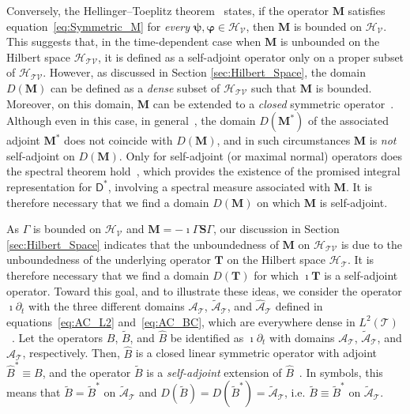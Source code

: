\documentclass[leqno,onefignum,onetabnum]{siamltex1213}
\newcommand{\Mb}{\mathbf{M}}
\newcommand{\Tb}{\mathbf{T}}
\newcommand{\Sb}{\mathbf{S}}
\newcommand{\Tc}{\mathcal{T}}
\newcommand{\Vc}{\mathcal{V}}
\newcommand{\Hc}{\mathcal{H}}
\newcommand{\Dm}{\mathsf{D}}
\newcommand{\As}{\mathscr{A}}
\newcommand{\vecpsi}{\boldsymbol{\psi}}
\newcommand{\vecvarphi}{\boldsymbol{\varphi}}
\begin{document}
Conversely, the Hellinger--Toeplitz theorem~\cite{Reed-1980} states,
if the operator $\Mb$ satisfies equation~\eqref{eq:Symmetric_M} for
\emph{every} $\vecpsi,\vecvarphi\in\Hc_{\Vc}$, then $\Mb$ is
bounded on $\Hc_{\Vc}$. This suggests that, in the time-dependent
case when $\Mb$ is unbounded on the Hilbert space $\Hc_{\Tc\Vc}$, it
is defined as a self-adjoint operator only on a proper subset of
$\Hc_{\Tc\Vc}$. However, as discussed in 
Section \ref{sec:Hilbert_Space}, the domain $D(\Mb)$ can be defined as
a \emph{dense} subset of $\Hc_{\Tc\Vc}$ such that $\Mb$ is
bounded. Moreover, on this domain, $\Mb$ can be extended to a 
\emph{closed} symmetric operator~\cite{Reed-1980,Stone:64}. Although
even in this case, in general~\cite{Reed-1980}, the domain $D(\Mb^*)$
of the associated adjoint $\Mb^*$ does not coincide with $D(\Mb)$, and
in such circumstances $\Mb$ is \emph{not} self-adjoint on $D(\Mb)$. Only for
self-adjoint (or maximal normal) operators does the spectral theorem
hold~\cite{Reed-1980}, which provides the existence of the promised 
integral representation for $\Dm^*$, involving a spectral measure
associated with $\Mb$. It is therefore necessary that we find a
domain $D(\Mb)$ on which $\Mb$ is self-adjoint.




As $\Gamma$ is bounded on $\Hc_{\Vc}$ and
$\Mb=-\imath\Gamma\Sb\Gamma$, our discussion in Section
\ref{sec:Hilbert_Space} indicates that the unboundedness of $\Mb$ on
$\Hc_{\Tc\Vc}$ is due to the unboundedness of the underlying operator
$\Tb$ on the Hilbert space $\Hc_{\Tc}$. It is therefore necessary
that we find a domain $D(\Tb)$ for which $\imath\Tb$ is a self-adjoint
operator. Toward this goal, and to illustrate these ideas, we consider
the operator $\imath\partial_t$ with the three different domains $\As_{\Tc}$,
$\tilde{\As}_{\Tc}$, and $\hat{\As}_{\Tc}$ defined in
equations~\eqref{eq:AC_L2} and~\eqref{eq:AC_BC}, which are everywhere
dense in $L^2(\Tc)$~\cite{Stone:64}. Let the operators $B$, $\tilde{B}$, and
$\hat{B}$ be identified as $\imath\partial_t$ with domains $\As_{\Tc}$,
$\tilde{\As}_{\Tc}$, and $\hat{\As}_{\Tc}$, respectively. Then,
$\hat{B}$ is a closed linear symmetric operator with adjoint
$\hat{B}^*\equiv B$, and the operator $\tilde{B}$ is a \emph{self-adjoint}
extension of $\hat{B}$~\cite{Stone:64}. In symbols, this means that 
$\tilde{B}=\tilde{B}^*$ on $\tilde{\As}_{\Tc}$ and
$D(\tilde{B})=D(\tilde{B}^*)=\tilde{\As}_{\Tc}$,
i.e. $\tilde{B}\equiv\tilde{B}^*$ on $\tilde{\As}_{\Tc}$.     
\end{document}
